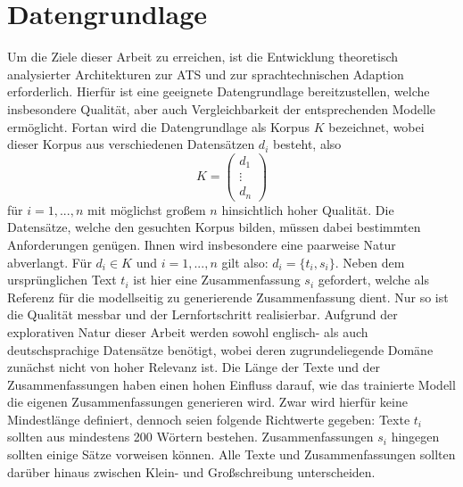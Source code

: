 \chapter{Datengrundlage}
\thispagestyle{fancy}
\label{chap:Datengrundlage}

\noindent
Um die Ziele dieser Arbeit zu erreichen, ist die Entwicklung theoretisch analysierter Architekturen zur \ac{ATS} und zur sprachtechnischen Adaption erforderlich. Hierfür ist eine geeignete Datengrundlage bereitzustellen, welche insbesondere Qualität, aber auch Vergleichbarkeit der entsprechenden Modelle ermöglicht. Fortan wird die Datengrundlage als Korpus $K$ bezeichnet, wobei dieser Korpus aus verschiedenen Datensätzen $d_i$ besteht, also $$K=\begin{pmatrix} d_1 \\ \vdots \\ d_n \end{pmatrix}$$ für $i=1,...,n$ mit möglichst großem $n$ hinsichtlich hoher Qualität. Die Datensätze, welche den gesuchten Korpus bilden, müssen dabei bestimmten Anforderungen genügen. Ihnen wird insbesondere eine paarweise Natur abverlangt. Für $d_i \in K$ und $i=1,...,n$ gilt also: $d_i=\{t_i,s_i\}$. Neben dem ursprünglichen Text $t_i$ ist hier eine Zusammenfassung $s_i$ gefordert, welche als Referenz für die modellseitig zu generierende Zusammenfassung dient. Nur so ist die Qualität messbar und der Lernfortschritt realisierbar. Aufgrund der explorativen Natur dieser Arbeit werden sowohl englisch- als auch deutschsprachige Datensätze benötigt, wobei deren zugrundeliegende Domäne zunächst nicht von hoher Relevanz ist. Die Länge der Texte und der Zusammenfassungen haben einen hohen Einfluss darauf, wie das trainierte Modell die eigenen Zusammenfassungen generieren wird. Zwar wird hierfür keine Mindestlänge definiert, dennoch seien folgende Richtwerte gegeben: Texte $t_i$ sollten aus mindestens 200 Wörtern bestehen. Zusammenfassungen $s_i$ hingegen sollten einige Sätze vorweisen können. Alle Texte und Zusammenfassungen sollten darüber hinaus zwischen Klein- und Großschreibung unterscheiden.
\newpage


